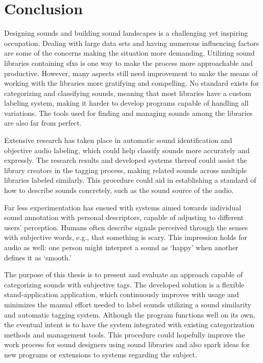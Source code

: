 \bgroup{}

\chapter{Conclusion}\label{cha:conclusion}
Designing sounds and building sound landscapes is a challenging yet inspiring occupation. Dealing with large data sets and having numerous influencing factors are some of the concerns making the situation more demanding. Utilizing sound libraries containing \glspl{sfx} is one way to make the process more approachable and productive. However, many aspects still need improvement to make the means of working with the libraries more gratifying and compelling. No standard exists for categorizing and classifying sounds, meaning that most libraries have a custom labeling system, making it harder to develop programs capable of handling all variations. The tools used for finding and managing sounds among the libraries are also far from perfect.

Extensive research has taken place in automatic sound identification and objective audio labeling, which could help classify sounds more accurately and expressly. The research results and developed systems thereof could assist the library creators in the tagging process, making related sounds across multiple libraries labeled similarly. This procedure could aid in establishing a standard of how to describe sounds concretely, such as the sound source of the audio.

Far less experimentation has ensued with systems aimed towards individual sound annotation with personal descriptors, capable of adjusting to different users' perception. Humans often describe signals perceived through the senses with subjective words, e.g., that something is scary. This impression holds for audio as well: one person might interpret a sound as `happy' when another defines it as `smooth.'

The purpose of this thesis is to present and evaluate an approach capable of categorizing sounds with subjective tags. The developed solution is a flexible stand-application application, which continuously improves with usage and minimizes the manual effort needed to label sounds utilizing a sound similarity and automatic tagging system. Although the program functions well on its own, the eventual intent is to have the system integrated with existing categorization methods and management tools. This procedure could hopefully improve the work process for sound designers using sound libraries and also spark ideas for new programs or extensions to systems regarding the subject.

